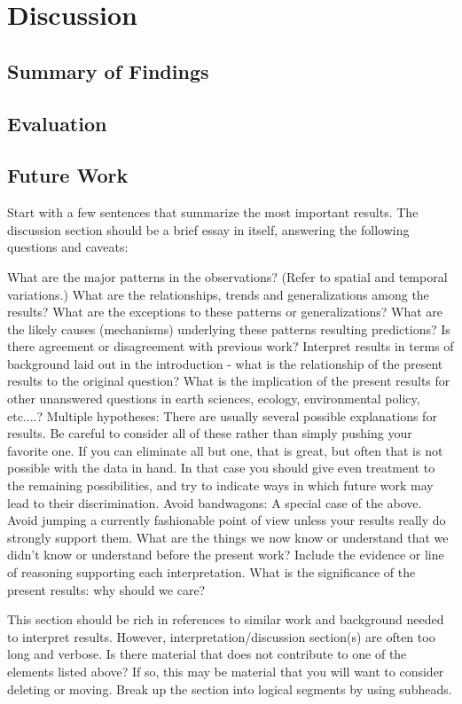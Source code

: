 \chapter{Discussion}
\label{chapterlabel5}
\section{Summary of Findings}
\section{Evaluation}
\section{Future Work}

Start with a few sentences that summarize the most important results. The discussion section should be a brief essay in itself, answering the following questions and caveats: 

    What are the major patterns in the observations? (Refer to spatial and temporal variations.)
    What are the relationships, trends and generalizations among the results?
    What are the exceptions to these patterns or generalizations?
    What are the likely causes (mechanisms) underlying these patterns resulting predictions?
    Is there agreement or disagreement with previous work?
    Interpret results in terms of background laid out in the introduction - what is the relationship of the present results to the original question?
    What is the implication of the present results for other unanswered questions in earth sciences, ecology, environmental policy, etc....?
    Multiple hypotheses: There are usually several possible explanations for results. Be careful to consider all of these rather than simply pushing your favorite one. If you can eliminate all but one, that is great, but often that is not possible with the data in hand. In that case you should give even treatment to the remaining possibilities, and try to indicate ways in which future work may lead to their discrimination.
    Avoid bandwagons: A special case of the above. Avoid jumping a currently fashionable point of view unless your results really do strongly support them. 
    What are the things we now know or understand that we didn't know or understand before the present work?
    Include the evidence or line of reasoning supporting each interpretation.
    What is the significance of the present results: why should we care? 

This section should be rich in references to similar work and background needed to interpret results. However, interpretation/discussion section(s) are often too long and verbose. Is there material that does not contribute to one of the elements listed above? If so, this may be material that you will want to consider deleting or moving. Break up the section into logical segments by using subheads. 